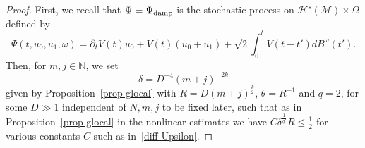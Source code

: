 \documentclass[10pt]{amsart}
\theoremstyle{definition}\newtheorem{defi}[theo]{Definition}\newtheorem{rema}[theo]{Remark}\newtheorem{exam}[theo]{Example}\newtheorem{exem}[theo]{Example}\newtheorem{nota}[theo]{Notation}
\newcommand{\damp}{\textup{damp}}
\newcommand{\N}{\mathbb{N}}
\newcommand{\M}{\mathcal{M}}
\renewcommand{\H}{\mathcal{H}}
\newcommand{\dl}{\delta}
\newcommand{\dt}{\partial_t}
\renewcommand{\o}{\omega}
\renewcommand{\O}{\Omega}
\begin{document}
\begin{proof}
First, we recall that $\Psi=\Psi_{\damp}$ is the stochastic process on $\H^s(\M)\times\O$ defined by
\begin{equation*}
\Psi(t,u_0,u_1,\o) = \dt V(t)u_0 + V(t)(u_0+u_1) + \sqrt{2}\int_{0}^tV(t-t')dB^\o(t').
\end{equation*}
Then, for $m,j\in \N$, we set
\begin{equation}\label{dlmj}
\dl = D^{-4}(m+j)^{-2k}
\end{equation}
given by Proposition~\ref{prop-glocal} with $R=D(m+j)^{\frac{k}2}$, $\theta = R^{-1}$ and $q=2$, for some $D\gg 1$ independent of $N,m,j$ to be fixed later, such that as in Proposition~\ref{prop-glocal} in the nonlinear estimates we have $C\dl^{\frac1{q'}}R \le \frac12$ for various constants $C$ such as in~\eqref{diff-Upsilon}.


\end{proof}
\end{document}
